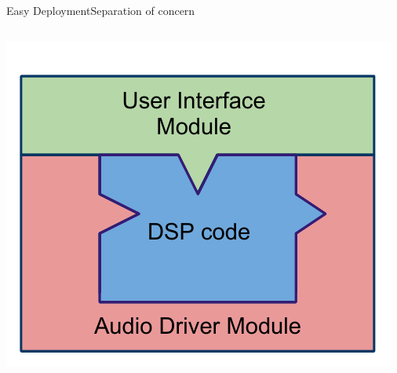 \begin{frame}{Easy Deployment}{Separation of concern}
\begin{columns}[t]
\begin{column}{0.75\textwidth}
        \begin{center}
        \includegraphics[height=0.2\textheight]{images/FaustArchitectureComplete}
        \end{center}
    \end{column}
    \end{columns}
    
\end{frame}
    
    
    
